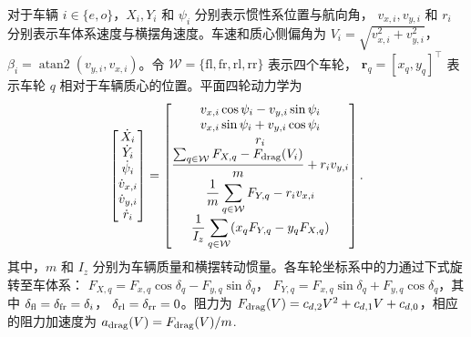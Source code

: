 \documentclass[final,5p,twocolumn]{elsarticle}
\begin{document}
对于车辆 $i\in\{e,o\}$，$X_i,Y_i$ 和 $\psi_i$ 分别表示惯性系位置与航向角，
$v_{x,i},v_{y,i}$ 和 $r_i$ 分别表示车体系速度与横摆角速度。车速和质心侧偏角为
$V_i=\sqrt{v_{x,i}^2+v_{y,i}^2}$，
$\beta_i=\operatorname{atan2}(v_{y,i},v_{x,i})$。令
$\mathcal W=\{\mathrm{fl},\mathrm{fr},\mathrm{rl},\mathrm{rr}\}$ 表示四个车轮，
$\bm r_q=[x_q,y_q]^\top$ 表示车轮 $q$ 相对于车辆质心的位置。平面四轮动力学为
\begin{equation}
\begin{bmatrix}
\dot X_i\\
\dot Y_i\\
\dot\psi_i\\
\dot v_{x,i}\\
\dot v_{y,i}\\
\dot r_i
\end{bmatrix}
=
\begin{bmatrix}
v_{x,i}\cos\psi_i-v_{y,i}\sin\psi_i\\
v_{x,i}\sin\psi_i+v_{y,i}\cos\psi_i\\
r_i\\
\displaystyle\frac{\sum_{q\in\mathcal W}F_{X,q}
-F_{\rm drag}(V_i)}{m}+r_iv_{y,i}\\[2mm]
\displaystyle\frac{1}{m}\sum_{q\in\mathcal W}F_{Y,q}-r_iv_{x,i}\\[2mm]
\displaystyle\frac{1}{I_z}\sum_{q\in\mathcal W}
(x_qF_{Y,q}-y_qF_{X,q})
\end{bmatrix}.
\label{eq:vehicle_dynamics}
\end{equation}
其中，$m$ 和 $I_z$ 分别为车辆质量和横摆转动惯量。各车轮坐标系中的力通过下式旋转至车体系：
$F_{X,q}=F_{x,q}\cos\delta_q-F_{y,q}\sin\delta_q$，
$F_{Y,q}=F_{x,q}\sin\delta_q+F_{y,q}\cos\delta_q$，其中
$\delta_{\rm fl}=\delta_{\rm fr}=\delta_i$，
$\delta_{\rm rl}=\delta_{\rm rr}=0$。阻力为
$F_{\rm drag}(V)=c_{d,2}V^2+c_{d,1}V+c_{d,0}$，相应的阻力加速度为
$a_{\rm drag}(V)=F_{\rm drag}(V)/m$.
\end{document}
